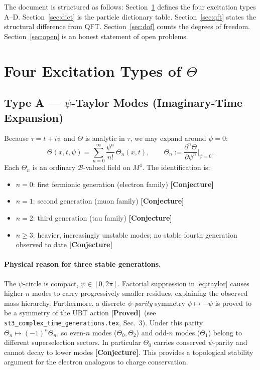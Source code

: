 \documentclass[12pt,a4paper]{article}
\theoremstyle{remark}
\newcommand{\B}{\mathcal{B}}
\newcommand{\proved}{\textbf{[Proved]}}
\newcommand{\conjecture}{\textbf{[Conjecture]}}
\begin{document}
The document is structured as follows: Section~\ref{sec:types} defines the
four excitation types A--D.  Section~\ref{sec:dict} is the particle
dictionary table.  Section~\ref{sec:qft} states the structural difference
from QFT.  Section~\ref{sec:dof} counts the degrees of freedom.
Section~\ref{sec:open} is an honest statement of open problems.

\section{Four Excitation Types of $\Theta$}
\label{sec:types}

\subsection{Type A — $\psi$-Taylor Modes (Imaginary-Time Expansion)}
\label{sec:typeA}

Because $\tau = t + i\psi$ and $\Theta$ is analytic in $\tau$, we may expand
around $\psi = 0$:
\begin{equation}
  \Theta(x, t, \psi) = \sum_{n=0}^{\infty} \frac{\psi^n}{n!}\,\Theta_n(x,t),
  \qquad
  \Theta_n := \frac{\partial^n\Theta}{\partial\psi^n}\bigg|_{\psi=0}.
  \label{eq:taylor}
\end{equation}
Each $\Theta_n$ is an ordinary $\B$-valued field on $M^4$.  The
identification is:

\begin{itemize}
  \item $n=0$: first fermionic generation (electron family) \conjecture
  \item $n=1$: second generation (muon family) \conjecture
  \item $n=2$: third generation (tau family) \conjecture
  \item $n\ge 3$: heavier, increasingly unstable modes;
        no stable fourth generation observed to date \conjecture
\end{itemize}

\paragraph{Physical reason for three stable generations.}
The $\psi$-circle is compact, $\psi\in[0,2\pi]$.  Factorial suppression in
\eqref{eq:taylor} causes higher-$n$ modes to carry progressively smaller
residues, explaining the observed mass hierarchy.  Furthermore, a discrete
$\psi$-\emph{parity} symmetry $\psi\mapsto -\psi$ is proved to be a symmetry
of the UBT action \proved\ (see \texttt{st3\_complex\_time\_generations.tex},
Sec.~3).  Under this parity $\Theta_n\mapsto(-1)^n\Theta_n$, so even-$n$
modes ($\Theta_0,\Theta_2$) and odd-$n$ modes ($\Theta_1$) belong to
different superselection sectors.  In particular $\Theta_0$ carries conserved
$\psi$-parity and cannot decay to lower modes \conjecture.  This provides a
topological stability argument for the electron analogous to charge
conservation.
\end{document}
